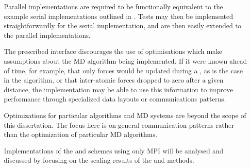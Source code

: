 Parallel implementations are required to be functionally equivalent
to the example serial implementations outlined in .
%
Tests may then be implemented straightforwardly for the serial implementation,
and are then easily extended to the parallel implementations.

The prescribed interface discourages the use of optimisations which make
assumptions about the MD algorithm being implemented.
%
If it were known ahead of time, for example, that
only forces would be updated during a \pairoperation{},
as is the case in the \velocityverlet{} algorithm,
or that inter-atomic forces dropped to zero after a given distance,
the implementation may be able to use this information to improve
performance through specialized data layouts or communications patterns.

Optimizations for particular algorithms and MD systems are
beyond the scope of this dissertation.
%
The focus here is on general communication patterns rather than
the optimization of particular MD algorithms.

Implementations of the \replicateddata{} and \systolicloop{} schemes
using only MPI will be analysed and discussed by focusing on
the scaling results of the \individualoperation{} and \pairoperation{} methods.




